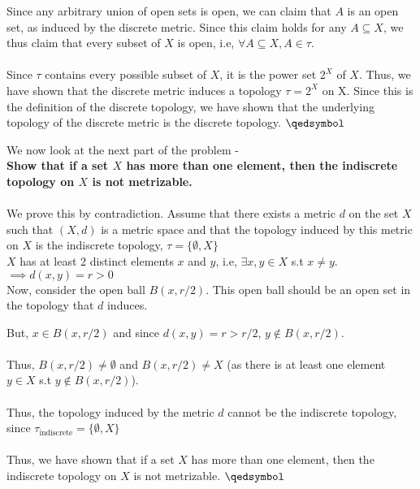 \begin{frame}
    Since any arbitrary union of open sets is open, we can claim that $A$ is an open set, as induced by the discrete metric. Since this claim holds for any $A \subseteq X$, we thus claim that every subset of $X$ is open, i.e, $\forall A \subseteq X, A \in \tau$.\\\\
    Since $\tau$ contains every possible subset of $X$, it is the power set $2^X$ of $X$. Thus, we have shown that the discrete metric induces a topology $\tau = 2^X$ on X. Since this is the definition of the discrete topology, we have shown that the underlying topology of the discrete metric is the discrete topology. $\qedsymbol$
\end{frame}

\begin{frame}
    We now look at the next part of the problem - \\
    \textbf{Show that if a set $X$ has more than one element, then the indiscrete topology on $X$ is not metrizable.}\\\\
    We prove this by contradiction. Assume that there exists a metric $d$ on the set $X$ such that $(X,d)$ is a metric space and that the topology induced by this metric on $X$ is the indiscrete topology, $\tau = \{ \emptyset , X \}$\\
    $X$ has at least 2 distinct elements $x$ and $y$, i.e, $\exists x,y \in X$ s.t $x \neq y$. \\
    $\implies d(x,y) = r > 0$ \\
    Now, consider the open ball $B(x,r/2)$. This open ball should be an open set in the topology that $d$ induces.
\end{frame}

\begin{frame}
    But, $x \in B(x,r/2)$ and since $d(x,y) = r > r/2$, $y \notin B(x,r/2)$. \\\\
    Thus, $B(x,r/2) \neq \emptyset$ and $B(x,r/2) \neq X$ (as there is at least one element $y \in X$ s.t $y \notin B(x,r/2)$).\\\\
    Thus, the topology induced by the metric $d$ cannot be the indiscrete topology, since $\tau_{\text{indiscrete}} = \{\emptyset, X\}$\\\\
    Thus, we have shown that if a set $X$ has more than one element, then the indiscrete topology on $X$ is not metrizable. $\qedsymbol$
\end{frame}